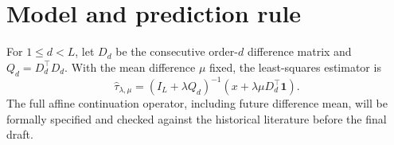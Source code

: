 \section{Model and prediction rule}
For $1\le d<L$, let $D_d$ be the consecutive order-$d$ difference
matrix and $Q_d=D_d^\top D_d$. With the mean difference $\mu$
fixed, the least-squares estimator is
\[
\widehat\tau_{\lambda,\mu}
=(I_L+\lambda Q_d)^{-1}
(x+\lambda\mu D_d^\top\mathbf1).
\]
The full affine continuation operator, including future difference
mean, will be formally specified and checked against the historical
literature before the final draft.
